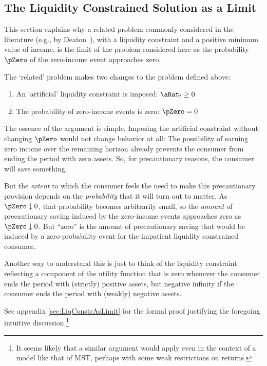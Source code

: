 \documentclass[BufferStockTheory]{subfiles}
\begin{document}
\hypertarget{The-Liquidity-Constrained-Solution-as-a-Limit}{}
\subsection{The Liquidity Constrained Solution as a Limit} \label{sec:deatonIsLimit}

This section explains why a related problem commonly considered in the
literature (e.g., by
Deaton~\citeyearpar{deatonLiqConstr}), with a liquidity constraint
and a positive minimum value of income, is the limit of the problem
considered here as the probability $\pZero$ of the zero-income event
approaches zero.

The `related' problem makes 
two changes to the problem defined above:
\begin{enumerate}
\item An `artificial' liquidity constraint is imposed: $\aRat_{t}\geq 0$
  \item The probability of zero-income events is zero: $\pZero=0$
\end{enumerate}

The essence of the argument is simple.  Imposing the artificial constraint without changing $\pZero$ would not change behavior at all: The possibility of earning zero income over the remaining horizon already prevents the consumer from ending the period with zero assets.  So, for precautionary reasons, the consumer will save something.

But the \textit{extent} to which the consumer feels the need to make this
precautionary provision depends on the \textit{probability} that it will turn
out to matter.  As $\pZero \downarrow 0$, that probability becomes
arbitrarily small, so the \textit{amount} of precautionary saving induced by the zero-income
events approaches zero as $\pZero \downarrow 0$.  But ``zero'' is the amount of precautionary saving that would
be induced by a zero-probability event for the impatient liquidity constrained consumer.

Another way to understand this is just to think of the liquidity
constraint reflecting a component of the utility
function that is zero whenever the consumer ends the period with
(strictly) positive assets, but negative infinity if the consumer
ends the period with (weakly) negative assets.

See appendix \ref{sec:LiqConstrAsLimit} for the formal proof justifying the
foregoing intuitive discussion.\footnote{It seems likely that a similar argument
  would apply even in the context of a model like that of MST, perhaps with some weak
  restrictions on returns.}
\end{document}
